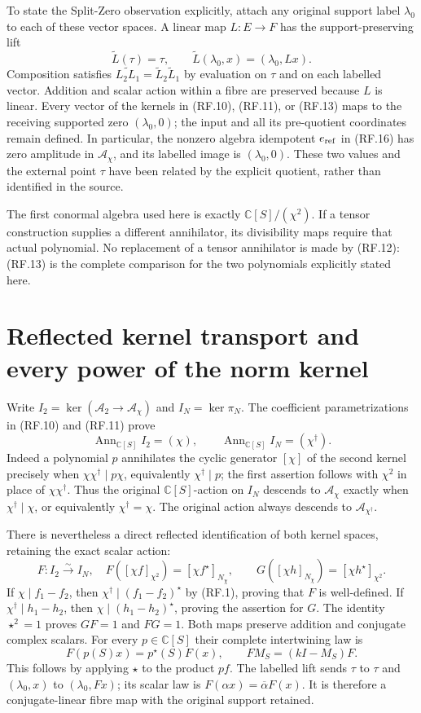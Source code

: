 \documentclass[11pt]{article}
\newcommand{\C}{\mathbb C}
\newcommand{\A}{\mathcal A}
\begin{document}
To state the Split-Zero observation explicitly, attach any original
support label $\lambda_0$ to each of these vector spaces. A linear
map $L:E\to F$ has the support-preserving lift
\[
 \widetilde L(\tau)=\tau,\qquad
 \widetilde L(\lambda_0,x)=(\lambda_0,Lx).
 \tag{RF.17}
\]
Composition satisfies $\widetilde{L_2L_1}
=\widetilde L_2\widetilde L_1$ by evaluation on $\tau$ and on
each labelled vector. Addition and scalar action within a fibre
are preserved because $L$ is linear. Every vector of the kernels
in (RF.10), (RF.11), or (RF.13) maps to the receiving supported
zero $(\lambda_0,0)$; the input and all its pre-quotient coordinates
remain defined. In particular, the nonzero algebra idempotent
$e_{\rm ref}$ in (RF.16) has zero amplitude in $\A_\chi$, and
its labelled image is $(\lambda_0,0)$. These two values and the
external point $\tau$ have been related by the explicit quotient,
rather than identified in the source.

The first conormal algebra used here is exactly $\C[S]/(\chi^2)$.
If a tensor construction supplies a different annihilator, its
divisibility maps require that actual polynomial. No replacement
of a tensor annihilator is made by (RF.12): (RF.13) is the complete
comparison for the two polynomials explicitly stated here.

\section{Reflected kernel transport and every power of the norm kernel}

Write $I_2=\ker(\A_2\to\A_\chi)$ and $I_N=\ker\pi_N$.
The coefficient parametrizations in (RF.10) and (RF.11) prove
\[
 \operatorname{Ann}_{\C[S]}I_2=(\chi),\qquad
 \operatorname{Ann}_{\C[S]}I_N=(\chi^\dagger).
 \tag{RF.18}
\]
Indeed a polynomial $p$ annihilates the cyclic generator $[\chi]$
of the second kernel precisely when $\chi\chi^\dagger\mid p\chi$,
equivalently $\chi^\dagger\mid p$; the first assertion follows
with $\chi^2$ in place of $\chi\chi^\dagger$. Thus the original
$\C[S]$-action on $I_N$ descends to $\A_\chi$ exactly when
$\chi^\dagger\mid\chi$, or equivalently $\chi^\dagger=\chi$.
The original action always descends to $\A_{\chi^\dagger}$.

There is nevertheless a direct reflected identification of both
kernel spaces, retaining the exact scalar action:
\[
 F:I_2\xrightarrow{\sim}I_N,\quad
 F([\chi f]_{\chi^2})=[\chi f^\star]_{N_\chi},\qquad
 G([\chi h]_{N_\chi})=[\chi h^\star]_{\chi^2}.
 \tag{RF.19}
\]
If $\chi\mid f_1-f_2$, then $\chi^\dagger\mid(f_1-f_2)^\star$
by (RF.1), proving that $F$ is well-defined. If
$\chi^\dagger\mid h_1-h_2$, then
$\chi\mid(h_1-h_2)^\star$, proving the assertion for $G$.
The identity $\star^2=1$ proves $GF=1$ and $FG=1$.
Both maps preserve addition and conjugate complex scalars.
For every $p\in\C[S]$ their complete intertwining law is
\[
 F(p(S)x)=p^\star(S)F(x),\qquad
 FM_S=(kI-M_S)F.
 \tag{RF.20}
\]
This follows by applying $\star$ to the product $pf$. The
labelled lift sends $\tau$ to $\tau$ and $(\lambda_0,x)$ to
$(\lambda_0,Fx)$; its scalar law is
$F(\alpha x)=\overline\alpha F(x)$. It is therefore a
conjugate-linear fibre map with the original support retained.
\end{document}
